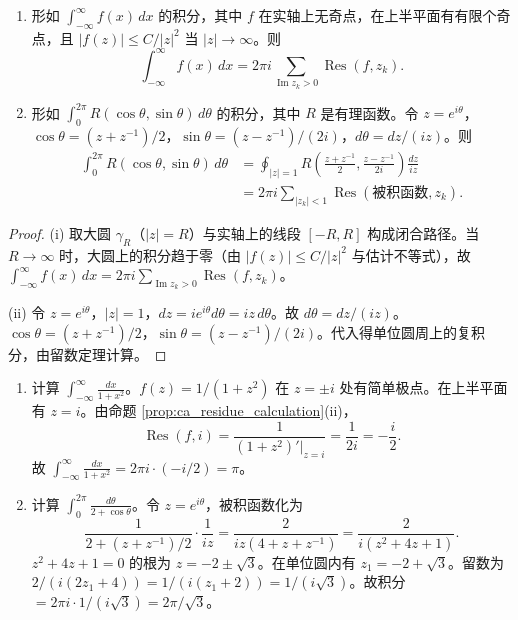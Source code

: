 \begin{corollary}[留数定理的实积分应用]\label{cor:ca_residue_real_integral}
\begin{enumerate}[label=(\roman*)]
    \item 形如 $\int_{-\infty}^{\infty} f(x) \, dx$ 的积分，其中 $f$ 在实轴上无奇点，在上半平面有有限个奇点，且 $|f(z)| \le C/|z|^2$ 当 $|z| \to \infty$。则
    \[
    \int_{-\infty}^{\infty} f(x) \, dx = 2\pi i \sum_{\operatorname{Im} z_k > 0} \operatorname{Res}(f, z_k).
    \]
    \item 形如 $\int_0^{2\pi} R(\cos\theta, \sin\theta) \, d\theta$ 的积分，其中 $R$ 是有理函数。令 $z = e^{i\theta}$，$\cos\theta = (z + z^{-1})/2$，$\sin\theta = (z - z^{-1})/(2i)$，$d\theta = dz/(iz)$。则
    \[
    \begin{aligned}
    \int_0^{2\pi} R(\cos\theta, \sin\theta) \, d\theta
      &= \oint_{|z| = 1} R\left( \frac{z + z^{-1}}{2}, \frac{z - z^{-1}}{2i} \right) \frac{dz}{iz}\\
      &= 2\pi i \sum_{|z_k| < 1} \operatorname{Res}(\text{被积函数}, z_k).
    \end{aligned}
    \]
\end{enumerate}
\end{corollary}

\begin{proof}
(i) 取大圆 $\gamma_R$（$|z| = R$）与实轴上的线段 $[-R, R]$ 构成闭合路径。当 $R \to \infty$ 时，大圆上的积分趋于零（由 $|f(z)| \le C/|z|^2$ 与估计不等式），故 $\int_{-\infty}^{\infty} f(x) \, dx = 2\pi i \sum_{\operatorname{Im} z_k > 0} \operatorname{Res}(f, z_k)$。

(ii) 令 $z = e^{i\theta}$，$|z| = 1$，$dz = i e^{i\theta} d\theta = iz \, d\theta$。故 $d\theta = dz/(iz)$。$\cos\theta = (z + z^{-1})/2$，$\sin\theta = (z - z^{-1})/(2i)$。代入得单位圆周上的复积分，由留数定理计算。
\end{proof}

\begin{example}[留数定理的实积分计算]\label{ex:ca_residue_real_integral}
\begin{enumerate}[label=(\roman*)]
    \item 计算 $\displaystyle\int_{-\infty}^{\infty} \frac{dx}{1 + x^2}$。$f(z) = 1/(1 + z^2)$ 在 $z = \pm i$ 处有简单极点。在上半平面有 $z = i$。由命题 \ref{prop:ca_residue_calculation}(ii)，
    \[
    \operatorname{Res}(f, i) = \frac{1}{(1 + z^2)'|_{z=i}} = \frac{1}{2i} = -\frac{i}{2}.
    \]
    故 $\int_{-\infty}^{\infty} \frac{dx}{1 + x^2} = 2\pi i \cdot (-i/2) = \pi$。
    \item 计算 $\displaystyle\int_0^{2\pi} \frac{d\theta}{2 + \cos\theta}$。令 $z = e^{i\theta}$，被积函数化为
    \[
    \frac{1}{2 + (z + z^{-1})/2} \cdot \frac{1}{iz} = \frac{2}{iz(4 + z + z^{-1})} = \frac{2}{i(z^2 + 4z + 1)}.
    \]
    $z^2 + 4z + 1 = 0$ 的根为 $z = -2 \pm \sqrt{3}$。在单位圆内有 $z_1 = -2 + \sqrt{3}$。留数为 $2/(i(2z_1 + 4)) = 1/(i(z_1 + 2)) = 1/(i\sqrt{3})$。故积分 $= 2\pi i \cdot 1/(i\sqrt{3}) = 2\pi/\sqrt{3}$。
\end{enumerate}
\end{example}

